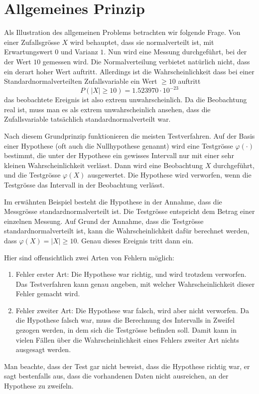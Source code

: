 \section{Allgemeines Prinzip}
Als Illustration des allgemeinen Problems betrachten wir folgende Frage.
Von einer Zufallsgrösse $X$ wird behauptet, dass sie normalverteilt ist,
mit Erwartungswert $0$ und Varianz $1$.
Nun wird eine Messung durchgeführt, bei der der Wert $10$ gemessen wird.
Die Normalverteilung verbietet natürlich
nicht, dass ein derart hoher Wert auftritt.
Allerdings ist die
Wahrscheinlichkeit dass bei einer Standardnormalverteilten Zufallsvariable
ein Wert $\ge 10$ auftritt
\[
P(|X|\ge 10)=1.523970\cdot 10^{-23}
\]
das beobachtete Ereignis ist also extrem unwahrscheinlich.
Da die Beobachtung
real ist, muss man es als extrem unwahrscheinlich ansehen, dass die
Zufallsvariable tatsächlich standardnormalverteilt war.

Nach diesem Grundprinzip funktionieren die meisten Testverfahren.
Auf der Basis einer Hypothese (oft auch die Nullhypothese genannt)
wird eine Testgrösse $\varphi(\cdot)$ bestimmt, die 
unter der Hypothese ein gewisses Intervall nur mit einer sehr kleinen
Wahrscheinlichkeit verlässt.
Dann wird eine Beobachtung $X$ durchgeführt, und die Testgrösse
$\varphi(X)$ ausgewertet.
Die Hypothese wird verworfen, wenn die
Testgrösse das Intervall in der Beobachtung verlässt.

Im erwähnten Beispiel besteht die Hypothese in der Annahme, dass die
Messgrösse standardnormalverteilt ist.
Die Testgrösse entspricht dem Betrag einer einzelnen Messung.
Auf Grund der Annahme, dass die Testgrösse
standardnormalverteilt ist, kann die Wahrscheinlichkeit dafür berechnet
werden, dass $\varphi(X)=|X|\ge10$.
Genau dieses Ereignis tritt dann ein.

Hier sind offensichtlich zwei Arten von Fehlern möglich:
\begin{enumerate}
\item Fehler erster Art: Die Hypothese war richtig, und wird trotzdem verworfen.
Das Testverfahren kann genau angeben, mit welcher Wahrscheinlichkeit
dieser Fehler gemacht wird.
\item Fehler zweiter Art: Die Hypothese war falsch, wird aber nicht verworfen.
Da die Hypothese falsch war, muss die Berechnung des Intervalls in Zweifel
gezogen werden, in dem sich die Testgrösse befinden soll.
Damit kann
in vielen Fällen über die Wahrscheinlichkeit eines Fehlers zweiter
Art nichts ausgesagt werden.
\end{enumerate}
Man beachte, dass der Test gar nicht beweist, dass die Hypothese richtig
war, er sagt bestenfalls aus, dass die vorhandenen Daten nicht ausreichen,
an der Hypothese zu zweifeln.

